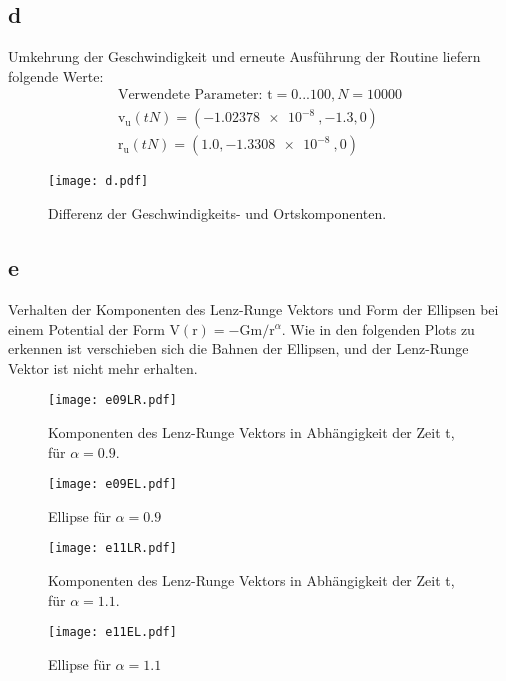 \documentclass[paper=a4, ngerman]{scrartcl}
\begin{document}
\FloatBarrier
\subsection{d}
Umkehrung der Geschwindigkeit und erneute Ausführung der Routine liefern folgende Werte:
\begin{align}
	\nonumber \text{Verwendete Parameter:  } \mathrm{t}= 0...100, N=10000\\
    \nonumber \mathrm{v}_\mathrm{u}(tN)=(\SI{-1.02378e-8}{}, -1.3, 0) \\
    \nonumber \mathrm{r}_\mathrm{u}(tN)=(1.0, \SI{-1.3308e-8}{}, 0) 
\end{align}
\begin{figure}[htbp]
	\centering
	\texttt{[image: d.pdf]}
	\caption{Differenz der Geschwindigkeits- und Ortskomponenten.}
	\label{fig:d}
\end{figure}

\FloatBarrier
\subsection{e}
Verhalten der Komponenten des Lenz-Runge Vektors und Form der Ellipsen bei einem Potential der Form $\mathrm{V(r)}=-\mathrm{Gm}/\mathrm{r}^{\alpha}$.
Wie in den folgenden Plots zu erkennen ist verschieben sich die Bahnen der Ellipsen, und der Lenz-Runge Vektor ist nicht mehr erhalten.
\begin{figure}[htbp]
	\centering
	\texttt{[image: e09LR.pdf]}
	\caption{Komponenten des Lenz-Runge Vektors in Abhängigkeit der Zeit t, für $\alpha=0.9$.}
	\label{fig:e09l}
\end{figure}
\begin{figure}[htbp]
	\centering
	\texttt{[image: e09EL.pdf]}
	\caption{Ellipse für $\alpha=0.9$}
	\label{fig:label}
\end{figure}
\begin{figure}[htbp]
	\centering
	\texttt{[image: e11LR.pdf]}
	\caption{Komponenten des Lenz-Runge Vektors in Abhängigkeit der Zeit t, für $\alpha=1.1$.}
	\label{fig:e1LR}
\end{figure}
\begin{figure}[htbp]
	\centering
	\texttt{[image: e11EL.pdf]}
	\caption{Ellipse für $\alpha=1.1$}
	\label{fig:label}
\end{figure}
\end{document}
